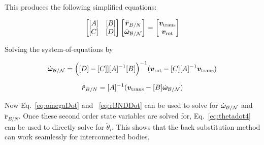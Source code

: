 This produces the following simplified equations:

\begin{equation}
	\begin{bmatrix}
		[A] & [B]\\
		[C] & [D]
	\end{bmatrix} \begin{bmatrix}
		\ddot{\bm r}_{B/N}\\
		\dot{\bm\omega}_{\cal B/N}
	\end{bmatrix} = \begin{bmatrix}
		\bm v_{\text{trans}}\\
		\bm v_{\text{rot}}
	\end{bmatrix}
\end{equation}

Solving the system-of-equations by

\begin{equation}
	\dot{\bm\omega}_{\cal B/N} = \Big([D] - [C]][A]^{-1}[B]\Big)^{-1}(\bm v_{\text{rot}} - [C][A]^{-1}\bm v_{\text{trans}})
	\label{eq:omegaDot}
\end{equation}

\begin{equation}
	\ddot{\bm r}_{B/N} = [A]^{-1} (\bm v_{\text{trans}} - [B]\dot{\bm\omega}_{\cal B/N})
	\label{eq:rBNDDot}
\end{equation}

Now Eq.~\eqref{eq:omegaDot} and ~\eqref{eq:rBNDDot} can be used to solve for $\dot{\bm\omega}_{\cal B/N}$ and $\ddot{\bm r}_{B/N}$. Once these second order state variables are solved for, Eq.~\eqref{eq:thetadot4} can be used to directly solve for $\ddot \theta_{i}$. This shows that the back substitution method can work seamlessly for interconnected bodies.


